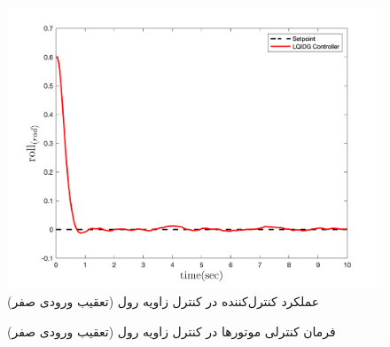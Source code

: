 \begin{figure}[H]
	\includegraphics[width=.48\linewidth]{../Figures/MIL/LQIDG/Roll/lqidg_roll.png}
	\centering
	\caption{عملكرد کنترل‌کننده  در کنترل زاويه رول (تعقیب ورودی صفر)}
	\label{lqidg_roll_fig_simulation_n}
\end{figure}
\begin{figure}[H]
	\centering
	\caption{‫‪فرمان کنترلی موتورها در کنترل زاویه رول (تعقیب ورودی صفر)}
\end{figure}
